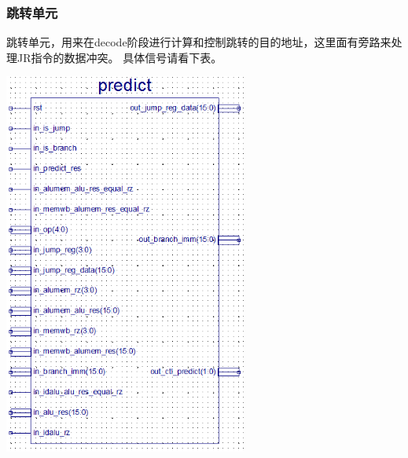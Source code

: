 \subsubsection{跳转单元}
    跳转单元，用来在decode阶段进行计算和控制跳转的目的地址，这里面有旁路来处理JR指令的数据冲突。
    具体信号请看下表。
\begin{center}
    \includegraphics[width=8cm]{image/detail/detail_predict.png}
    \label{fig:predict}
\end{center}
